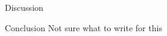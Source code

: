 \documentclass{article}
\begin{document}
\begin{section}{Discussion}
\begin{section}{Conclusion}
    Not sure what to write for this
\end{section}
\end{section}


\printbibliography
\end{document}
